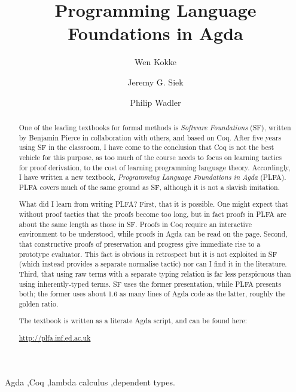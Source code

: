 \documentclass[preprint,authoryear]{elsarticle}
\begin{document}
\title{Programming Language Foundations in Agda}

\author[adr1]{Wen Kokke}
\author[adr2]{Jeremy G. Siek}
\author[adr1]{Philip Wadler}

\address[adr1]{University of Edinburgh, 10 Crichton Street, EH8 9AB, Edinburgh}
\address[adr2]{Indiana University, 700 N Woodlawn Ave, Bloomington, IN 47408, USA}

\begin{abstract}
  One of the leading textbooks for formal methods is \emph{Software Foundations} (SF), written by Benjamin Pierce in collaboration with others, and based on Coq. After five years using SF in the classroom, I have come to the conclusion that Coq is not the best vehicle for this purpose, as too much of the course needs to focus on learning tactics for proof derivation, to the cost of learning programming language theory.  Accordingly, I have written a new textbook, \emph{Programming Language Foundations in Agda} (PLFA). PLFA covers much of the same ground as SF, although it is not a slavish imitation.

  What did I learn from writing PLFA? First, that it is possible. One might expect that without proof tactics that the proofs become too long, but in fact proofs in PLFA are about the same length as those in SF. Proofs in Coq require an interactive environment to be understood, while proofs in Agda can be read on the page.  Second, that constructive proofs of preservation and progress give immediate rise to a prototype evaluator. This fact is obvious in retrospect but it is not exploited in SF (which instead provides a separate normalise tactic) nor can I find it in the literature.  Third, that using raw terms with a separate typing relation is far less perspicuous than using inherently-typed terms. SF uses the former presentation, while PLFA presents both; the former uses about 1.6 as many lines of Agda code as the latter, roughly the golden ratio.

  The textbook is written as a literate Agda script, and can be found here:
  \begin{center}
    \url{http://plfa.inf.ed.ac.uk}
  \end{center}
\end{abstract}

\begin{keyword}
  Agda \sep Coq \sep lambda calculus \sep dependent types.  
\end{keyword}
\end{document}
